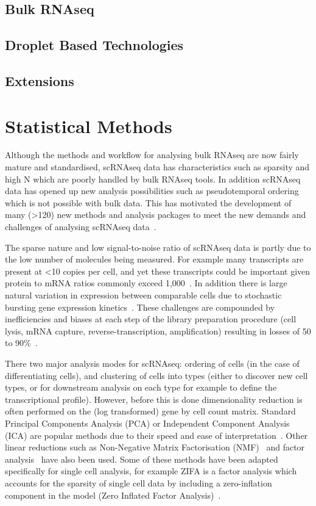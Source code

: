 \subsection{Bulk RNAseq}


\subsection{Droplet Based Technologies}

\subsection{Extensions}

\section{Statistical Methods}

Although the methods and workflow for analysing bulk RNAseq are now fairly mature and standardised, scRNAseq data has characteristics such as sparsity and high N which are poorly handled by bulk RNAseq tools. In addition scRNAseq data has opened up new analysis possibilities such as pseudotemporal ordering which is not possible with bulk data. This has motivated the development of many (\textgreater 120) new methods and analysis packages to meet the new demands and challenges of analysing scRNAseq data~\cite{Zappia2017scRNAtools}.

The sparse nature and low signal-to-noise ratio of scRNAseq data is partly due to the low number of molecules being measured. For example many transcripts are present at \textless 10 copies per cell, and yet these transcripts could be important given protein to mRNA ratios commonly exceed 1,000~\cite{Lahtvee2017Absolute,Marguerat2012Quantitative}. In addition there is large natural variation in expression between comparable cells due to stochastic bursting gene expression kinetics~\cite{Raj2006Stochastic}. These challenges are compounded by inefficiencies and biases at each step of the library preparation procedure (cell lysis, mRNA capture, reverse-transcription, amplification) resulting in losses of 50 to 90\%~\cite{Islam2012Highly}.

There two major analysis modes for scRNAseq: ordering of cells (in the case of differentiating cells), and clustering of cells into types (either to discover new cell types, or for downstream analysis on each type for example to define the transcriptional profile). However, before this is done dimensionality reduction is often performed on the (log transformed) gene by cell count matrix. Standard Principal Components Analysis (PCA) or Independent Component Analysis (ICA) are popular methods due to their speed and ease of interpretation~\cite{Satija2015Spatial,Trapnell2014dynamics}. Other linear reductions such as Non-Negative Matrix Factorisation (NMF)~\cite{Shao2017Robust} and factor analysis~\cite{Buettner2015Computational} have also been used. Some of these methods have been adapted specifically for single cell analysis, for example ZIFA is a factor analysis which accounts for the sparsity of single cell data by including a zero-inflation component in the model (Zero Inflated Factor Analysis)~\cite{Pierson2015ZIFA}.

